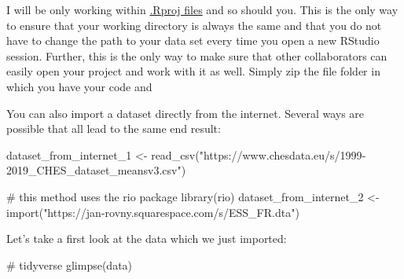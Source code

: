 \documentclass[
  letterpaper,
  DIV=11,
  numbers=noendperiod]{scrreprt}
\newenvironment{Shaded}{\begin{snugshade}}{\end{snugshade}}
\newcommand{\CommentTok}[1]{\textcolor[rgb]{0.37,0.37,0.37}{#1}}
\newcommand{\FunctionTok}[1]{\textcolor[rgb]{0.28,0.35,0.67}{#1}}
\newcommand{\NormalTok}[1]{\textcolor[rgb]{0.00,0.23,0.31}{#1}}
\newcommand{\OtherTok}[1]{\textcolor[rgb]{0.00,0.23,0.31}{#1}}
\newcommand{\StringTok}[1]{\textcolor[rgb]{0.13,0.47,0.30}{#1}}
\begin{document}
\begin{tcolorbox}[enhanced jigsaw, toprule=.15mm, colframe=quarto-callout-important-color-frame, left=2mm, titlerule=0mm, opacityback=0, colbacktitle=quarto-callout-important-color!10!white, coltitle=black, breakable, colback=white, opacitybacktitle=0.6, rightrule=.15mm, bottomrule=.15mm, bottomtitle=1mm, toptitle=1mm, title=\textcolor{quarto-callout-important-color}{\faExclamation}\hspace{0.5em}{Important}, arc=.35mm, leftrule=.75mm]

I will be only working within
\href{https://support.posit.co/hc/en-us/articles/200526207-Using-RStudio-Projects}{.Rproj
files} and so should you. \footnotemark{} This is the only way to ensure
that your working directory is always the same and that you do not have
to change the path to your data set every time you open a new RStudio
session. Further, this is the only way to make sure that other
collaborators can easily open your project and work with it as well.
Simply zip the file folder in which you have your code and

\end{tcolorbox}


You can also import a dataset directly from the internet. Several ways
are possible that all lead to the same end result:

\begin{Shaded}
\begin{Highlighting}[]
\NormalTok{dataset\_from\_internet\_1 }\OtherTok{\textless{}{-}} \FunctionTok{read\_csv}\NormalTok{(}\StringTok{"https://www.chesdata.eu/s/1999{-}2019\_CHES\_dataset\_meansv3.csv"}\NormalTok{)}
  
\CommentTok{\# this method uses the rio package}
\FunctionTok{library}\NormalTok{(rio)}
\NormalTok{dataset\_from\_internet\_2 }\OtherTok{\textless{}{-}} \FunctionTok{import}\NormalTok{(}\StringTok{"https://jan{-}rovny.squarespace.com/s/ESS\_FR.dta"}\NormalTok{)}
\end{Highlighting}
\end{Shaded}

Let's take a first look at the data which we just imported:

\begin{Shaded}
\begin{Highlighting}[]
\CommentTok{\# tidyverse}
\FunctionTok{glimpse}\NormalTok{(data)}
\end{Highlighting}
\end{Shaded}
\end{document}
